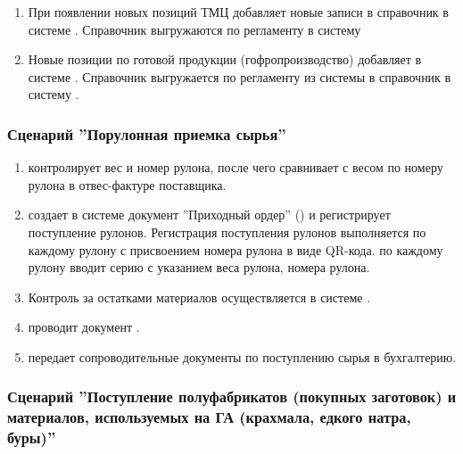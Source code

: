 \begin{enumerate}
\item При появлении новых позиций ТМЦ \kladovshik  добавляет новые записи в справочник  в системе \erp. Справочник выгружаются по регламенту в систему \gofro 
\item Новые позиции по готовой продукции (гофропроизводство) добавляет \manager в системе \erp. Справочник выгружается по регламенту из системы \erp в справочник  в систему \gofro.
\end{enumerate}



\subsubsection{Сценарий ''Порулонная приемка сырья''}
\label{bp:storage_5}

\begin{enumerate}
\item \kladovshik контролирует вес и номер рулона, после чего сравнивает с весом по номеру рулона в отвес-фактуре поставщика.

\item \kladovshik создает в системе \erp документ ”Приходный ордер” ()
и регистрирует поступление рулонов.
Регистрация поступления рулонов выполняется по каждому рулону с присвоением номера рулона в виде QR-кода.
\kladovshik по каждому рулону  вводит серию с указанием веса рулона, номера рулона. 

\item Контроль за остатками материалов осуществляется в системе \erp.

\item \kladovshik проводит документ .
\item \kladovshik передает сопроводительные документы по поступлению сырья в бухгалтерию.


\end{enumerate}


\subsubsection{Сценарий ''Поступление полуфабрикатов (покупных заготовок) и материалов, используемых на ГА (крахмала, едкого натра, буры)'' }
\label{bp:storage_51}

